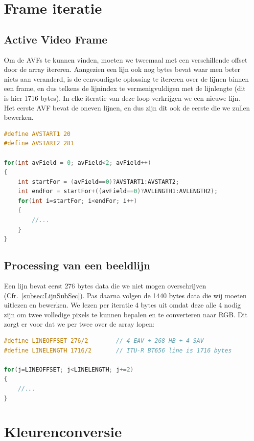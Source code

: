 \section{Frame iteratie}
	\subsection{Active Video Frame}
		\par Om de AVFs te kunnen vinden, moeten we tweemaal met een verschillende offset door de array itereren. Aangezien een lijn ook nog bytes bevat waar men beter niets aan veranderd, is de eenvoudigste oplossing te itereren over de lijnen binnen een frame, en dus telkens de lijnindex te vermenigvuldigen met de lijnlengte (dit is hier 1716 bytes). In elke iteratie van deze loop verkrijgen we een nieuwe lijn. Het eerste AVF bevat de oneven lijnen, en dus zijn dit ook de eerste die we zullen bewerken.
		\smallskip
		\begin{lstlisting}[language=C,caption=Code voor het itereren over een frame]
#define AVSTART1 20
#define AVSTART2 281

for(int avField = 0; avField<2; avField++)
{
	int startFor = (avField==0)?AVSTART1:AVSTART2;
	int endFor = startFor+((avField==0)?AVLENGTH1:AVLENGTH2);
	for(int i=startFor; i<endFor; i++)
	{
		//...
	}
}		\end{lstlisting}

	\subsection{Processing van een beeldlijn}
		\par Een lijn bevat eerst 276 bytes data die we niet mogen overschrijven (Cfr.~\ref{subsec:LijnSubSec}). Pas daarna volgen de 1440 bytes data die wij moeten uitlezen en bewerken. We lezen per iteratie 4 bytes uit omdat deze alle 4 nodig zijn om twee volledige pixels te kunnen bepalen en te converteren naar RGB. Dit zorgt er voor dat we per twee over de array lopen:
		\smallskip
		\begin{lstlisting}[language=C,caption=Code voor her itereren over een lijn]
#define LINEOFFSET 276/2		// 4 EAV + 268 HB + 4 SAV
#define LINELENGTH 1716/2		// ITU-R BT656 line is 1716 bytes

for(j=LINEOFFSET; j<LINELENGTH; j+=2)
{
	//...
}		\end{lstlisting}

\section{Kleurenconversie}
